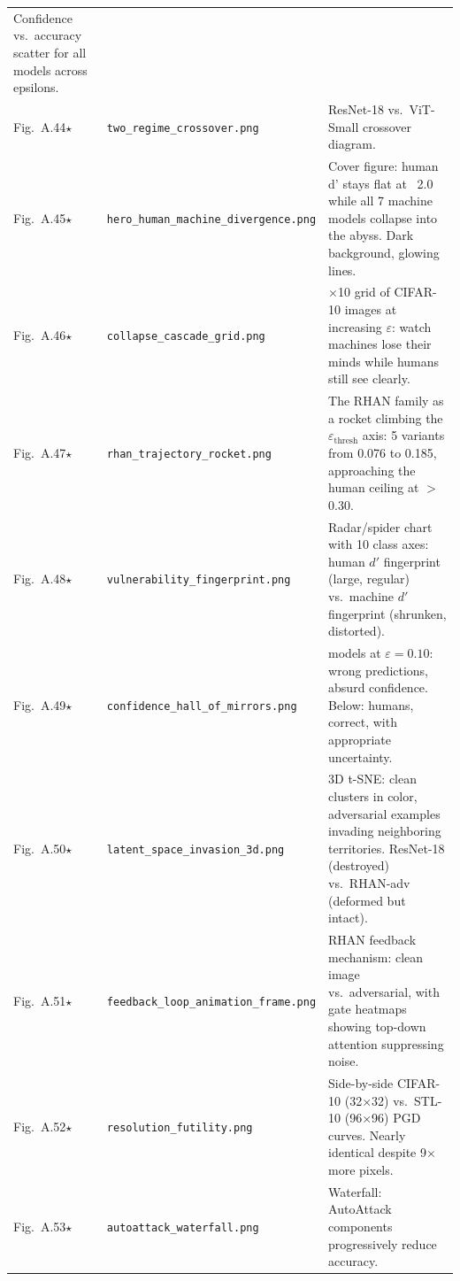 \documentclass[12pt,a4paper]{article}
\begin{document}
\begin{longtable}{>{\raggedright\arraybackslash}p{2.1cm} >{\raggedright\arraybackslash}p{5.2cm} >{\raggedright\arraybackslash}p{\dimexpr\textwidth-2.1cm-5.2cm-4\tabcolsep\relax}}
Confidence vs.\ accuracy scatter for all models across epsilons. \\
Fig.~A.44$\star$ & \texttt{two\_\allowbreak{}regime\_\allowbreak{}crossover.png} &
ResNet-18 vs.\ ViT-Small crossover diagram. \\
\midrule
Fig.~A.45$\star$ & \texttt{hero\_\allowbreak{}human\_\allowbreak{}machine\_\allowbreak{}divergence.png} &
Cover figure: human d' stays flat at ~2.0 while all 7 machine models
collapse into the abyss. Dark background, glowing lines. \\
Fig.~A.46$\star$ & \texttt{collapse\_\allowbreak{}cascade\_\allowbreak{}grid.png} &
10$\times$10 grid of CIFAR-10 images at increasing $\varepsilon$:
watch machines lose their minds while humans still see clearly. \\
Fig.~A.47$\star$ & \texttt{rhan\_\allowbreak{}trajectory\_\allowbreak{}rocket.png} &
The RHAN family as a rocket climbing the $\varepsilon_{\text{thresh}}$
axis: 5 variants from 0.076 to 0.185, approaching the human ceiling
at $>$0.30. \\
Fig.~A.48$\star$ & \texttt{vulnerability\_\allowbreak{}fingerprint.png} &
Radar/spider chart with 10 class axes: human $d'$ fingerprint (large,
regular) vs.\ machine $d'$ fingerprint (shrunken, distorted). \\
Fig.~A.49$\star$ & \texttt{confidence\_\allowbreak{}hall\_\allowbreak{}of\_\allowbreak{}mirrors.png} &
6 models at $\varepsilon{=}0.10$: wrong predictions, absurd confidence.
Below: humans, correct, with appropriate uncertainty. \\
Fig.~A.50$\star$ & \texttt{latent\_\allowbreak{}space\_\allowbreak{}invasion\_\allowbreak{}3d.png} &
3D t-SNE: clean clusters in color, adversarial examples invading
neighboring territories. ResNet-18 (destroyed) vs.\ RHAN-adv
(deformed but intact). \\
Fig.~A.51$\star$ & \texttt{feedback\_\allowbreak{}loop\_\allowbreak{}animation\_\allowbreak{}frame.png} &
RHAN feedback mechanism: clean image vs.\ adversarial, with gate
heatmaps showing top-down attention suppressing noise. \\
Fig.~A.52$\star$ & \texttt{resolution\_\allowbreak{}futility.png} &
Side-by-side CIFAR-10 (32$\times$32) vs.\ STL-10 (96$\times$96) PGD
curves. Nearly identical despite 9$\times$ more pixels. \\
Fig.~A.53$\star$ & \texttt{autoattack\_\allowbreak{}waterfall.png} &
Waterfall: AutoAttack components progressively reduce accuracy.

\end{longtable}
\end{document}
